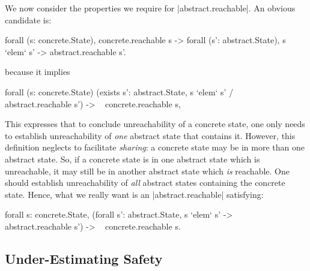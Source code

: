 \documentclass[runningheads]{llncs}
\newcommand{\weg}[1]{}
\begin{document}
We now consider the properties we require for |abstract.reachable|. An obvious candidate is:
\begin{code}
  forall (s: concrete.State), concrete.reachable s ->
    forall (s': abstract.State), s `elem` s' -> abstract.reachable s'.
\end{code}
because it implies
\begin{code}
forall (s: concrete.State)
  (exists s': abstract.State, s `elem` s' /\ ~ abstract.reachable s') ->
    ~ concrete.reachable s,
\end{code}
This expresses that to conclude unreachability of a concrete state,
one only needs to establish unreachability of \emph{one} abstract state
that contains it. However, this definition neglects to facilitate {\em
  sharing}: a concrete state may be in more than one
abstract state. So, if a concrete state is in one abstract state which is unreachable, it may still be in another abstract state which {\em is\/} reachable.
One should establish unreachability of \emph{all}
abstract states containing the concrete state. Hence, what we really
want is an |abstract.reachable| satisfying:
\begin{code}
forall s: concrete.State,
  (forall s': abstract.State, s `elem` s' -> ~ abstract.reachable s') ->
  ~ concrete.reachable s.
\end{code}
\weg{
This property follows from the following new definition of |reachable_respect| we will use:
\begin{code}
Definition reachable_respect: Prop :=
  shared_cover concrete.reachable abstract.reachable.
\end{code}
}

\subsection{Under-Estimating Safety}
\label{underestimatingsafety}

\end{document}
